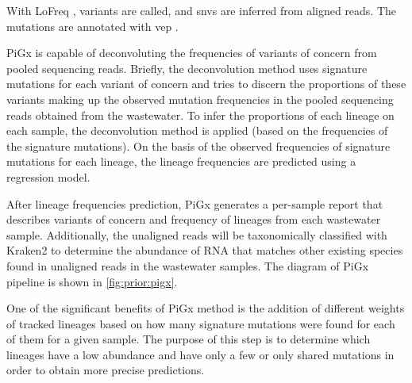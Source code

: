         With LoFreq \cite{lofreq}, variants are called, and \acrshort{snvs} are inferred from aligned reads. The mutations are annotated with \acrshort{vep} \cite{mclaren2016}. 
        
        PiGx is capable of deconvoluting the frequencies of variants of concern from pooled sequencing reads. Briefly, the deconvolution method uses signature mutations for each variant of concern and tries to discern the proportions of these variants making up the observed mutation frequencies in the pooled sequencing reads obtained from the wastewater. To infer the proportions of each lineage on each sample, the deconvolution method is applied (based on the frequencies of the signature mutations). On the basis of the observed frequencies of signature mutations for each lineage, the lineage frequencies are predicted using a regression model. 
        
        After lineage frequencies prediction, PiGx generates a per-sample report that describes variants of concern and frequency of lineages from each wastewater sample. Additionally, the unaligned reads will be taxonomically classified with Kraken2 \cite{wood2014,wood2019,lu2020} to determine the abundance of RNA that matches other existing species found in unaligned reads in the wastewater samples. The diagram of PiGx pipeline is shown in \cref{fig:prior:pigx}.
        
        One of the significant benefits of PiGx method is the addition of different weights of tracked lineages based on how many signature mutations were found for each of them for a given sample. The purpose of this step is to determine which lineages have a low abundance and have only a few or only shared mutations in order to obtain more precise predictions. 

